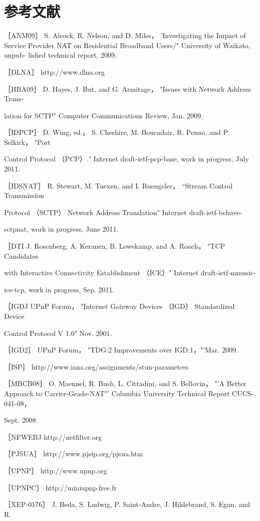 \section{参考文献}

［ANM09］ S. Alcock, R. Nelson, and D. Miles， 'Investigating the Impact of Service
Provider NAT on Residential Broadband Users/" University of Waikato, unpub-
lished technical report, 2009.

［DLNA］ http://www.dlna.org

［HBA09］ D. Hayes, J. But, and G. Armitage， "Issues with Network Address Trans-

lation for SCTP" Computer Communications Review, Jan. 2009.

［IDPCP］ D. Wing, ed.， S. Cheshire, M. Boucadair, R. Penno, and P. Selkirk， "Port

Control Protocol （PCP）." Internet draft-ietf-pcp-base, work in progress, July 2011.

［IDSNAT］ R. Stewart, M. Tuexen, and I. Ruengeler， “Stream Control Transmission

Protocol （SCTP） Network Address Translation" Internet draft-ietf-behave-

sctpnat, work in progress, June 2011.

［DTI J. Rosenberg, A. Keranen, B. Lowekamp, and A. Roach， "TCP Candidates

with Interactive Connectivity Establishment （ICE）" Internet draft-ietf-mmusic-

ice-tcp, work in progress, Sep. 2011.

［IGDJ UPnP Forum， "Internet Gateway Devices （IGD） Standardized Device

Control Protocol V 1.0" Nov. 2001.

［IGD2］ UPnP Forum， "TDG:2 Improvements over IGD:1，"'Mar. 2009.

［ISP］ http://www.iana.org/assignments/stun-parameters

［MBCB08］ O. Maennel, R. Bush, L. Cittadini, and S. Bellovin， "'A Better Approack
to Carrier-Grade-NAT"' Columbia University Technical Report CUCS-041-08，

Sept. 2008.

［NFWEBJ http://netfilter.org

［PJSUA］ http://www.pjsip.org/pjsua.htm

［UPNP］ http://www.upnp.org

［UPNPC］ http://miniupnp.free.fr

［XEP-0176］ J. Beda, S. Ludwig, P. Saint-Andre, J. Hildebrand, S. Egan, and R.

